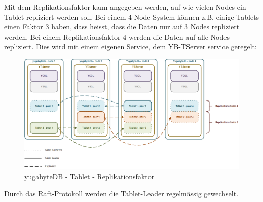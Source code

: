 \begin{flushleft}
    Mit dem Replikationsfaktor  kann angegeben werden, auf wie vielen Nodes ein Tablet repliziert werden soll.
    Bei einem 4-Node System können z.B. einige Tablets einen Faktor 3 haben, dass heisst, dass die Daten nur auf 3 Nodes repliziert werden.
    Bei einem Replikationsfaktor 4 werden die Daten auf alle Nodes repliziert.
    Dies wird mit einem eigenen Service, dem YB-TServer service \cite{RSV64WED} geregelt:
    \begin{figure}[H]
        \centering
        \includegraphics[width=0.8\linewidth]{source/implementation/evaluation/postgresql_ha_solutions/yugabytedb/yugabytedb-tablet-replication-factor}
        \caption{yugabyteDB - Tablet - Replikationsfaktor}
        \label{fig:yugabytedb-tablet-replication-factor}
    \end{figure}
\end{flushleft}
\begin{flushleft}
    Durch das Raft-Protokoll werden die Tablet-Leader regelmässig gewechselt.

\end{flushleft}

